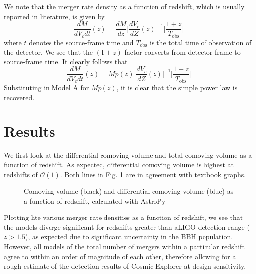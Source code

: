 \documentclass{article}
\begin{document}
We note that the merger rate density as a function of redshift, which is usually reported in literature, is given by 
\begin{equation}
    \frac{dM}{dV_c dt} (z) = \frac{dM}{dz} \Big[ \frac{dV_c}{dZ} (z) \Big]^{-1} \Big[ \frac{1+z}{T_\text{obs}}\Big]
\end{equation}
where $t$ denotes the source-frame time and $T_\text{obs}$ is the total time of observation of the detector. We see that the $(1+z)$ factor converts from detector-frame to source-frame time. It clearly follows that 
\begin{equation}
    \frac{dM}{dV_c dt} (z) = M p(z) \Big[ \frac{dV_c}{dZ} (z) \Big]^{-1} \Big[ \frac{1+z}{T_\text{obs}}\Big]
\end{equation}
Substituting in Model A for $M p(z)$, it is clear that the simple power law is recovered. 



\section{Results}

We first look at the differential comoving volume and total comoving volume as a function of redshift. As expected, differential comoving volume is highest at redshifts of $\mathcal{O} (1)$. Both lines in Fig. \ref{fig:dist} are in agreement with textbook graphs.  

\begin{figure}[!htb]
    \caption{\label{fig:dist} Comoving volume (black) and differential comoving volume (blue) as a function of redshift, calculated with AstroPy}
\end{figure}

Plotting hte various merger rate densities as a function of redshift, we see that the models diverge significant for redshifts greater than aLIGO detection range ($z > 1.5$), as expected due to significant uncertainty in the BBH population. However, all models of the total number of mergers within a particular redshift agree to within an order of magnitude of each other, therefore allowing for a rough estimate of the detection results of Cosmic Explorer at design sensitivity. \\
\end{document}
